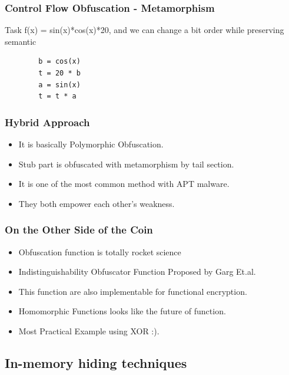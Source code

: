 \documentclass{beamer}
\begin{document}

\begin{frame} 
\frametitle{Control Flow Obfuscation - Metamorphism}
Task f(x) = sin(x)*cos(x)*20, and we can change a bit order while preserving semantic
\begin{example}
	\begin{verbatim}
		b = cos(x)
		t = 20 * b
		a = sin(x)
		t = t * a\end{verbatim}
	\end{example}
\end{frame}


\begin{frame} %
\frametitle{Hybrid Approach}
\begin{itemize}
	\item It is basically Polymorphic Obfuscation.
	\item Stub part is obfuscated with metamorphism by tail section.
	\item It is one of the most common method with APT malware.
	\item They both empower each other's weakness.
\end{itemize}
\end{frame}

\begin{frame} %
\frametitle{On the Other Side of the Coin}
\begin{itemize}
	\item Obfuscation function is totally rocket science
	\item Indistinguishability Obfuscator Function Proposed by Garg Et.al.
	\item This function are also implementable for functional encryption.
	\item Homomorphic Functions looks like the future of function.
	\item Most Practical Example using XOR :).
\end{itemize}
\end{frame}

\subsection{In-memory hiding techniques}
\end{document}
